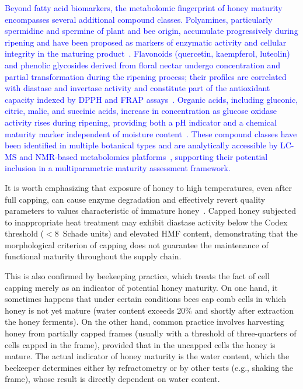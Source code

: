 \textcolor{blue}{Beyond fatty acid biomarkers, the metabolomic fingerprint of honey maturity encompasses several additional compound classes. Polyamines, particularly spermidine and spermine of plant and bee origin, accumulate progressively during ripening and have been proposed as markers of enzymatic activity and cellular integrity in the maturing product~\cite{guo2020,biochemreactions2022}. Flavonoids (quercetin, kaempferol, luteolin) and phenolic glycosides derived from floral nectar undergo concentration and partial transformation during the ripening process; their profiles are correlated with diastase and invertase activity and constitute part of the antioxidant capacity indexed by DPPH and FRAP assays~\cite{guo2020}. Organic acids, including gluconic, citric, malic, and succinic acids, increase in concentration as glucose oxidase activity rises during ripening, providing both a pH indicator and a chemical maturity marker independent of moisture content~\cite{zhang2021,biochemreactions2022}. These compound classes have been identified in multiple botanical types and are analytically accessible by LC-MS and NMR-based metabolomics platforms~\cite{nmrhoney2023}, supporting their potential inclusion in a multiparametric maturity assessment framework.}

It is worth emphasizing that exposure of honey to high temperatures,
even after full capping, can cause enzyme degradation and effectively
revert quality parameters to values characteristic of immature
honey~\cite{biochemreactions2022}.
Capped honey subjected to inappropriate heat treatment may exhibit
diastase activity below the Codex threshold ($< 8$~Schade units)
and elevated HMF content, demonstrating that the morphological
criterion of capping does not guarantee the maintenance of
functional maturity throughout the supply chain.

This is also confirmed by beekeeping practice, which treats the
fact of cell capping merely as an indicator of potential honey
maturity. On one hand, it sometimes happens that under certain
conditions bees cap comb cells in which honey is not yet mature
(water content exceeds 20\% and shortly after extraction the honey
ferments). On the other hand, common practice involves harvesting
honey from partially capped frames (usually with a threshold of
three-quarters of cells capped in the frame), provided that in
the uncapped cells the honey is mature. The actual indicator of
honey maturity is the water content, which the beekeeper determines
either by refractometry or by other tests (e.g., shaking the frame),
whose result is directly dependent on water content.

